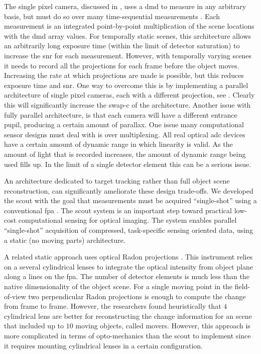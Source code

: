 The single pixel camera, discussed in , uses a \acrfull{dmd} to measure in any arbitrary basis, but must do so over many time-sequential measurements \cite{duarte2008single}. Each measurement is an integrated point-by-point multiplication of the scene locations with the \gls{dmd} array values. For temporally static scenes, this architecture allows an arbitrarily long exposure time (within the limit of detector saturation) to increase the \gls{snr} for each measurement. However, with temporally varying scenes it needs to record all the projections for each frame before the object moves.  Increasing the rate at which projections are made is possible, but this reduces exposure time and \gls{snr}. One way to overcome this is by implementing a parallel architecture of single pixel cameras, each with a different projection, see . Clearly this will significantly increase the \gls{swap-c} of the architecture. Another issue with fully parallel architecture, is that each camera will have a different entrance pupil, producing a certain amount of parallax. One issue many computational sensor designs must deal with is over multiplexing. All real optical \gls{adc} devices have a certain amount of dynamic range in which linearity is valid. As the amount of light that is recorded increases, the amount of dynamic range being used fills up. In the limit of a single detector element this can be a serious issue. 

An architecture dedicated to target tracking rather than full object scene reconstruction, can significantly ameliorate these design trade-offs. We developed the \acrfull{scout} with the goal that measurements must be acquired ``single-shot'' using a conventional \gls{fpa} \cite{townsend2012static, poon2012advances}. The \gls{scout} system is an important step toward practical low-cost computational sensing for optical imaging. The system enables parallel ``single-shot'' acquisition of compressed, task-specific sensing oriented data, using a static (no moving parts) architecture.

A related static approach uses optical Radon projections \cite{kashter2012optical}. This instrument relies on a several cylindrical lenses to integrate the optical intensity from object plane along a lines on the \gls{fpa}. The number of detector elements is much less than the native dimensionality of the object scene. For a single moving point in the field-of-view two perpendicular Radon projections is enough to compute the change from frame to frame. However, the researchers found heuristically that $4$ cylindrical lens are better for reconstructing the change information for an scene that included up to $10$ moving objects, called movers. However, this approach is more complicated in terms of opto-mechanics than the \gls{scout} to implement since it requires mounting cylindrical lenses in a certain configuration. 

